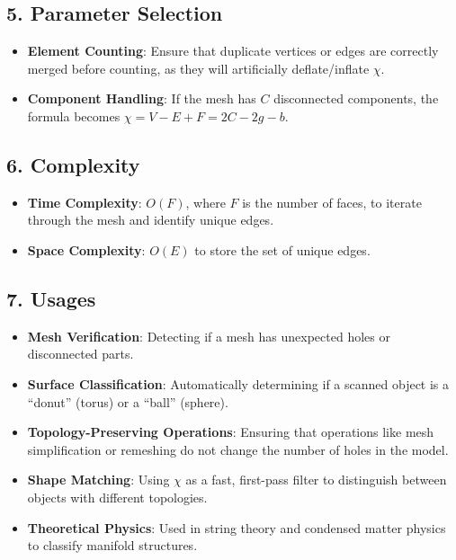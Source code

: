 \subsection{5. Parameter Selection}

\begin{itemize}
    \item \textbf{Element Counting}: Ensure that duplicate vertices or edges are correctly merged before counting, as they will artificially deflate/inflate $\chi$.
    \item \textbf{Component Handling}: If the mesh has $C$ disconnected components, the formula becomes $\chi = V - E + F = 2C - 2g - b$.
\end{itemize}

\subsection{6. Complexity}

\begin{itemize}
    \item \textbf{Time Complexity}: $O(F)$, where $F$ is the number of faces, to iterate through the mesh and identify unique edges.
    \item \textbf{Space Complexity}: $O(E)$ to store the set of unique edges.
\end{itemize}

\subsection{7. Usages}

\begin{itemize}
    \item \textbf{Mesh Verification}: Detecting if a mesh has unexpected holes or disconnected parts.
    \item \textbf{Surface Classification}: Automatically determining if a scanned object is a ``donut'' (torus) or a ``ball'' (sphere).
    \item \textbf{Topology-Preserving Operations}: Ensuring that operations like mesh simplification or remeshing do not change the number of holes in the model.
    \item \textbf{Shape Matching}: Using $\chi$ as a fast, first-pass filter to distinguish between objects with different topologies.
    \item \textbf{Theoretical Physics}: Used in string theory and condensed matter physics to classify manifold structures.
\end{itemize}

